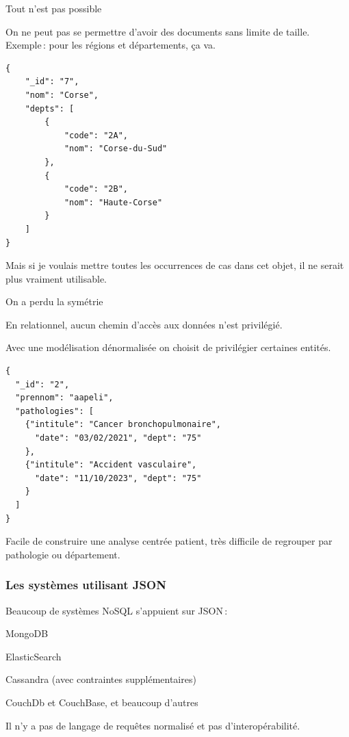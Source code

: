 \begin{frame}{Tout n'est pas possible}

On ne peut pas se permettre d'avoir des documents sans limite de taille.
Exemple\,: pour les régions et départements, ça va.

\begin{verbatim}
{
	"_id": "7",
	"nom": "Corse",
	"depts": [
		{
			"code": "2A",
			"nom": "Corse-du-Sud"
		},
		{
			"code": "2B",
			"nom": "Haute-Corse"
		}
	]
}
\end{verbatim}

\vfill
Mais si je voulais mettre toutes les occurrences de cas dans cet objet,
il ne serait plus vraiment utilisable.
\end{frame}



\begin{frame}{On a perdu la symétrie}

En relationnel, aucun chemin d'accès aux données n'est privilégié.

\vfill

Avec une modélisation dénormalisée on choisit de privilégier 
certaines entités.

\vfill
\begin{verbatim}
{
  "_id": "2",
  "prennom": "aapeli",
  "pathologies": [
    {"intitule": "Cancer bronchopulmonaire",
      "date": "03/02/2021", "dept": "75"
    },
    {"intitule": "Accident vasculaire",
      "date": "11/10/2023", "dept": "75"
    }
  ]
}
\end{verbatim}

\vfill
Facile de construire une analyse centrée patient, très difficile 
de regrouper par pathologie ou département. 
\end{frame}

\begin{frame}[fragile]
\frametitle{Les systèmes utilisant JSON}

Beaucoup de systèmes NoSQL s'appuient sur JSON\,:

\begin{redbullet}
       \item MongoDB
       \item ElasticSearch
       \item Cassandra (avec contraintes supplémentaires)
       \item CouchDb et CouchBase, et beaucoup d'autres
 \end{redbullet}

\vfill

\begin{noteblock}
Il n'y a pas de langage de requêtes normalisé et pas d'interopérabilité.
\end{noteblock}
\end{frame}



